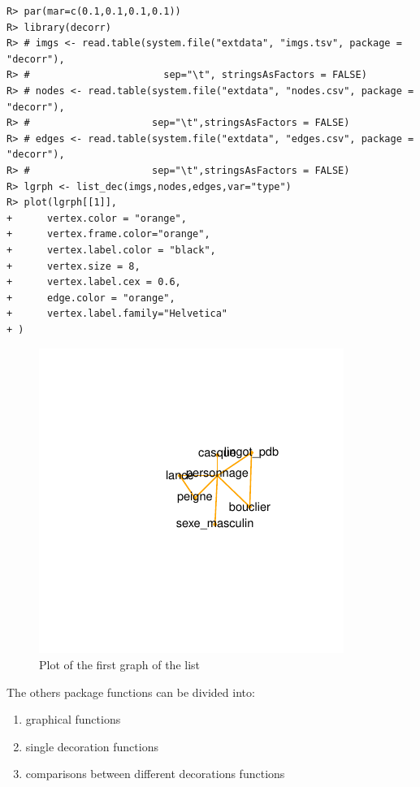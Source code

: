 \documentclass[article]{jss}\usepackage{knitr}
\begin{document}
\begin{kframe}
\begin{verbatim}
R> par(mar=c(0.1,0.1,0.1,0.1))
R> library(decorr)
R> # imgs <- read.table(system.file("extdata", "imgs.tsv", package = "decorr"),
R> #                       sep="\t", stringsAsFactors = FALSE)
R> # nodes <- read.table(system.file("extdata", "nodes.csv", package = "decorr"),
R> #                     sep="\t",stringsAsFactors = FALSE)
R> # edges <- read.table(system.file("extdata", "edges.csv", package = "decorr"),
R> #                     sep="\t",stringsAsFactors = FALSE)
R> lgrph <- list_dec(imgs,nodes,edges,var="type")
R> plot(lgrph[[1]],
+      vertex.color = "orange",
+      vertex.frame.color="orange",
+      vertex.label.color = "black",
+      vertex.size = 8,
+      vertex.label.cex = 0.6,
+      edge.color = "orange",
+      vertex.label.family="Helvetica"
+ )
\end{verbatim}
\end{kframe}\begin{figure}[H]

{\centering \includegraphics[width=\maxwidth]{figure/unnamed-chunk-8-1} 

}

\caption{\label{fig:figs}Plot of the first graph of the list}\label{fig:unnamed-chunk-8}
\end{figure}




The others  package functions can be divided into:
\begin{enumerate}
 \item graphical functions
 \item single decoration functions
 \item comparisons between different decorations functions
\end{enumerate}
\end{document}
